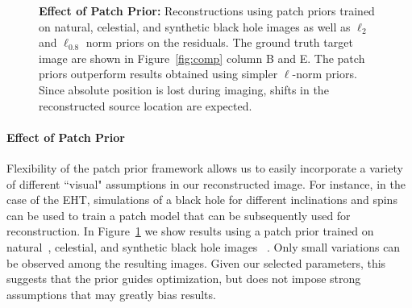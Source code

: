 \begin{figure}[b]
\begin{center}
\begin{tabular}{c c c c c}
 			
 			
 			
 		\end{tabular}
 		\caption{ \footnotesize{{\bf Effect of Patch Prior:} Reconstructions using patch priors trained on natural, celestial, and synthetic black hole images as well as $\ell_2$ and $\ell_{0.8}$ norm priors on the residuals. The ground truth target image are shown in Figure~\ref{fig:comp} column B and E. 
 				The patch priors outperform results obtained using simpler $\ell$-norm priors. 
 				Since absolute position is lost during imaging, shifts in the reconstructed source location are expected. 
 				} }
 		\label{fig:patchprior}
 		\vspace{-.35in}
 	\end{center}
 \end{figure}
 
 
 
 
 
 \vspace{-.15in}
 \paragraph{Effect of Patch Prior} Flexibility of the patch prior framework allows us to easily incorporate a variety of different ``visual" assumptions in our reconstructed image.
 For instance, in the case of the EHT, simulations of a black hole for different inclinations and spins can be used to train a patch model that can be subsequently used for reconstruction. 
 In Figure~\ref{fig:patchprior} we show results using a patch prior trained on natural~\cite{martin2001database}, celestial, and synthetic black hole images%
 ~\cite{avery}. Only small variations can be observed among the resulting images.
 Given our selected parameters, this suggests that the prior guides optimization, but does not impose strong assumptions that may greatly bias results.
  
